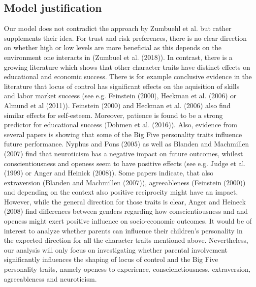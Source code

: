 \documentclass[%
    a4paper,            %
    11pt,               %
    bibliography=totoc, %
]
{scrartcl}
\begin{document}
\subsection{Model justification}
Our model does not contradict the approach by Zumbuehl et al. but rather supplements their idea. For trust and risk preferences, there is no clear direction on whether high or low levels are more beneficial as this depends on the environment one interacts in (Zumbuel et al. (2018)). In contrast, there is a growing literature which shows that other character traits have distinct effects on educational and economic success. There is for example conclusive evidence in the literature that locus of control has significant effects on the aquisition of skills and labor market success (see e.g. Feinstein (2000), Heckman et al. (2006) or Almund et al (2011)). Feinstein (2000) and Heckman et al. (2006) also find similar effects for self-esteem. Moreover, patience is found to be a strong predictor for educational success (Dohmen et al. (2016)). Also, evidence from several papers is showing that some of the Big Five personality traits influence future performance. Nyphus and Pons (2005) as well as Blanden and Machmillen (2007) find that neuroticism has a negative impact on future outcomes, whilest conscientiousness and openess seem to have positive effects (see e.g. Judge et al. (1999) or Anger and Heinick (2008)). Some papers indicate, that also extraversion (Blanden and Machmillen (2007)), agreeableness  (Feinstein (2000)) and depending on the context also positive reciprocity might have an impact. However, while the general direction for those traits is clear, Anger and Heineck (2008) find differences between genders regarding how conscientiousness and and openess might exert positive influence on socio-economic outcomes. It would be of interest to analyze whether parents can influence their children’s personality in the expected direction for all the character traits mentioned above. Nevertheless, our analysis will only focus on investigating whether parental involvement significantly influences the shaping of locus of control and the Big Five personality traits, namely openess to experience, conscienctiousness, extraversion, agreeableness and neuroticism.
\end{document}
